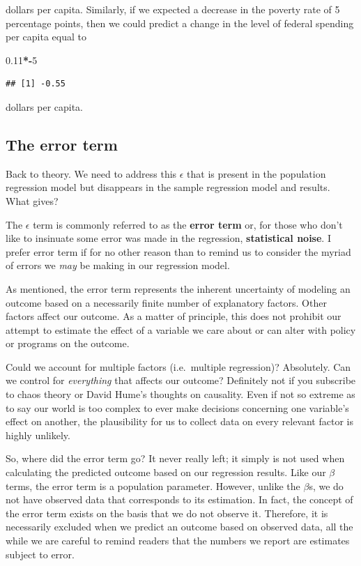 \documentclass[
]{book}
\newenvironment{Shaded}{\begin{snugshade}}{\end{snugshade}}
\newcommand{\DecValTok}[1]{\textcolor[rgb]{0.00,0.00,0.81}{#1}}
\newcommand{\FloatTok}[1]{\textcolor[rgb]{0.00,0.00,0.81}{#1}}
\newcommand{\OperatorTok}[1]{\textcolor[rgb]{0.81,0.36,0.00}{\textbf{#1}}}
\begin{document}
dollars per capita. Similarly, if we expected a decrease in the poverty rate of 5 percentage points, then we could predict a change in the level of federal spending per capita equal to

\begin{Shaded}
\begin{Highlighting}[]
\FloatTok{0.11}\OperatorTok{*-}\DecValTok{5}
\end{Highlighting}
\end{Shaded}

\begin{verbatim}
## [1] -0.55
\end{verbatim}

dollars per capita.

\hypertarget{the-error-term}{%
\subsection{The error term}\label{the-error-term}}

Back to theory. We need to address this \(\epsilon\) that is present in the population regression model but disappears in the sample regression model and results. What gives?

The \(\epsilon\) term is commonly referred to as the \textbf{error term} or, for those who don't like to insinuate some error was made in the regression, \textbf{statistical noise}. I prefer error term if for no other reason than to remind us to consider the myriad of errors we \emph{may} be making in our regression model.

As mentioned, the error term represents the inherent uncertainty of modeling an outcome based on a necessarily finite number of explanatory factors. Other factors affect our outcome. As a matter of principle, this does not prohibit our attempt to estimate the effect of a variable we care about or can alter with policy or programs on the outcome.

Could we account for multiple factors (i.e.~multiple regression)? Absolutely. Can we control for \emph{everything} that affects our outcome? Definitely not if you subscribe to chaos theory or David Hume's thoughts on causality. Even if not so extreme as to say our world is too complex to ever make decisions concerning one variable's effect on another, the plausibility for us to collect data on every relevant factor is highly unlikely.

So, where did the error term go? It never really left; it simply is not used when calculating the predicted outcome based on our regression results. Like our \(\beta\) terms, the error term is a population parameter. However, unlike the \(\beta\)s, we do not have observed data that corresponds to its estimation. In fact, the concept of the error term exists on the basis that we do not observe it. Therefore, it is necessarily excluded when we predict an outcome based on observed data, all the while we are careful to remind readers that the numbers we report are estimates subject to error.
\end{document}
